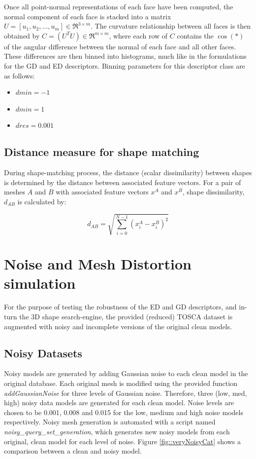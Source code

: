 \documentclass[12pt]{article}
\begin{document}
	\noindent
	Once all point-normal representations of each face have been computed, the normal component of each \ith face is stacked into a matrix $U = [u_{1},u_{2},...,u_{m}]\in\Re^{3\times m}$. The curvature relationship between all faces is then obtained by $C = (U^T U) \in \Re^{m \times m}$, where each \kth row of $C$ contains the $\cos(*)$ of the angular difference between the normal of each \kth face and all other faces. These differences are then binned into histograms, much like in the formulations for the GD and ED descriptors. Binning parameters for this descriptor class are as follows:
	\begin{itemize}
	\item{$dmin = -1$}
	\item{$dmin = 1$}
	\item{$dres = 0.001$}
	\end{itemize}


	\subsection*{Distance measure for shape matching}

		\noindent
		During shape-matching process, the distance (scalar dissimilarity) between shapes is determined by the distance between associated feature vectors. For a pair of meshes $A$ and $B$ with associated feature vectors $x^{A}$ and $x^{B}$, shape dissimilarity, $d_{AB}$ is calculated by:

		\begin{equation}
			d_{AB} = \sqrt{ \sum_{i=0}^{N-1} \left( x^{A}_{i} - x^{B}_{i} \right)^{2} }
			\label{eq::shape_distance}
		\end{equation} 



\section*{Noise and Mesh Distortion simulation}
	
	\noindent
	For the purpose of testing the robustness of the ED and GD descriptors, and in-turn the 3D shape search-engine, the provided (reduced) TOSCA dataset is augmented with noisy and incomplete versions of the original clean models.

	\subsection*{Noisy Datasets}

		\noindent
		Noisy models are generated by adding Gaussian noise to each clean model in the original database. Each original mesh is modified using the provided function \emph{addGaussianNoise} for three levels of Gaussian noise. Therefore, three (low, med, high) noisy data models are generated for each clean model. Noise levels are chosen to be 0.001, 0.008 and 0.015 for the low, medium and high noise models respectively. Noisy mesh generation is automated with a script named \emph{noisy\_query\_set\_generation}, which generates new noisy models from each original, clean model for each level of noise. Figure \ref{fig::veryNoisyCat} shows a comparison between a clean and noisy model.
\end{document}
